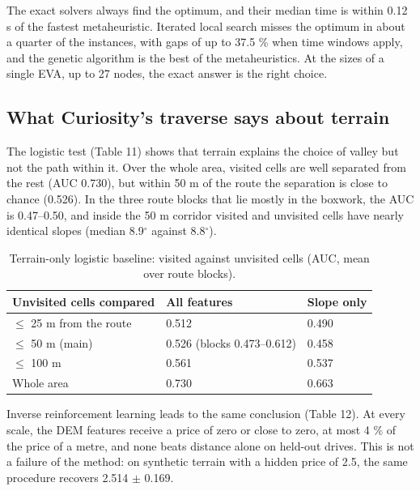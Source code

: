 \documentclass[11pt,a4paper]{article}
\begin{document}
The exact solvers always find the optimum, and their median time is within 0.12 s of the fastest metaheuristic. Iterated local search misses the optimum in about a quarter of the instances, with gaps of up to 37.5 \% when time windows apply, and the genetic algorithm is the best of the metaheuristics. At the sizes of a single EVA, up to 27 nodes, the exact answer is the right choice.

\subsection{What Curiosity's traverse says about terrain}

The logistic test (Table 11) shows that terrain explains the choice of valley but not the path within it. Over the whole area, visited cells are well separated from the rest (AUC 0.730), but within 50 m of the route the separation is close to chance (0.526). In the three route blocks that lie mostly in the boxwork, the AUC is 0.47--0.50, and inside the 50 m corridor visited and unvisited cells have nearly identical slopes (median 8.9$^\circ$ against 8.8$^\circ$).

\begin{table}[H]
\centering\small
\caption{Terrain-only logistic baseline: visited against unvisited cells (AUC, mean over route blocks).}
\begin{tabular}{lll}
\toprule
Unvisited cells compared & All features & Slope only \\
\midrule
$\le$ 25 m from the route & 0.512 & 0.490 \\
$\le$ 50 m (main) & 0.526 (blocks 0.473--0.612) & 0.458 \\
$\le$ 100 m & 0.561 & 0.537 \\
Whole area & 0.730 & 0.663 \\
\bottomrule
\end{tabular}
\end{table}

Inverse reinforcement learning leads to the same conclusion (Table 12). At every scale, the DEM features receive a price of zero or close to zero, at most 4 \% of the price of a metre, and none beats distance alone on held-out drives. This is not a failure of the method: on synthetic terrain with a hidden price of 2.5, the same procedure recovers 2.514 $\pm$ 0.169.
\end{document}
